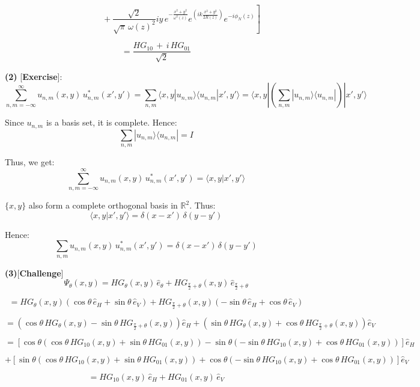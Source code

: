 \documentclass{article}
\begin{document}
\[
\left. \quad \quad \quad \quad \quad \quad +\frac{\sqrt{2}}{\sqrt{\pi} \, \omega(z)^2} 
i y \, e^{-\frac{x^2 + y^2}{\omega^2(z)}} e^{\left( i k \frac{x^2 + y^2}{2R(z)} \right)} e^{-i \phi_N(z)} \right]
\]

\[
= \frac{HG_{10} \, + \, i \, HG_{01}}{\sqrt{2}}
\]

\textbf{(2)} [\textbf{Exercise}]:
\[
\sum_{n,m=-\infty}^{\infty} u_{n,m}(x, y) \, u_{n,m}^*(x', y')
= \sum_{n,m} \langle x, y | u_{n,m} \rangle \langle u_{n,m} | x', y' \rangle
= \langle x, y | \left( \sum_{n,m} | u_{n,m} \rangle \langle u_{n,m} | \right) | x', y' \rangle
\]

Since \(u_{n,m}\) is a basis set, it is complete.  
Hence:
\[
\sum_{n,m} | u_{n,m} \rangle \langle u_{n,m} | = I
\]

Thus, we get:
\[
\sum_{n,m=-\infty}^{\infty} u_{n,m}(x, y) \, u_{n,m}^*(x', y') = \langle x, y | x', y' \rangle
\]

\(\{x, y\}\) also form a complete orthogonal basis in \(\mathbb{R}^2\).  
Thus:
\[
\langle x, y | x', y' \rangle = \delta(x - x') \, \delta(y - y')
\]

Hence:
\[
\sum_{n,m} u_{n,m}(x, y) \, u_{n,m}^*(x', y') = \delta(x - x') \, \delta(y - y')
\]

\textbf{(3)}[\textbf{Challenge}]
\[
\Psi_{\theta}(x, y) = HG_{\theta}(x, y) \, \hat{e}_{\theta} + HG_{\frac{\pi}{2}+\theta}(x, y) \, \hat{e}_{\frac{\pi}{2}+\theta}
\]

\[
= HG_{\theta}(x, y) \left( \cos \theta \, \hat{e}_H + \sin \theta \, \hat{e}_V \right)
+ HG_{\frac{\pi}{2}+\theta}(x, y) \left( -\sin \theta \, \hat{e}_H + \cos \theta \, \hat{e}_V \right)
\]

\[
= \left( \cos \theta \, HG_{\theta}(x, y) - \sin \theta \, HG_{\frac{\pi}{2}+\theta}(x, y) \right) \hat{e}_H 
+ \left( \sin \theta \, HG_{\theta}(x, y) + \cos \theta \, HG_{\frac{\pi}{2}+\theta}(x, y) \right) \hat{e}_V
\]

\[
= \left[ \cos \theta \left( \cos \theta \, HG_{10}(x,y) + \sin \theta \, HG_{01}(x,y) \right) 
- \sin \theta \left( -\sin \theta \, HG_{10}(x,y) + \cos \theta \, HG_{01}(x,y) \right) \right] \hat{e}_H
\]

\[
+ \left[ \sin \theta \left( \cos \theta \, HG_{10}(x,y) + \sin \theta \, HG_{01}(x,y) \right) 
+ \cos \theta \left( -\sin \theta \, HG_{10}(x,y) + \cos \theta \, HG_{01}(x,y) \right) \right] \hat{e}_V
\]

\[
= HG_{10}(x,y) \, \hat{e}_H + HG_{01}(x,y) \, \hat{e}_V
\]
\end{document}
